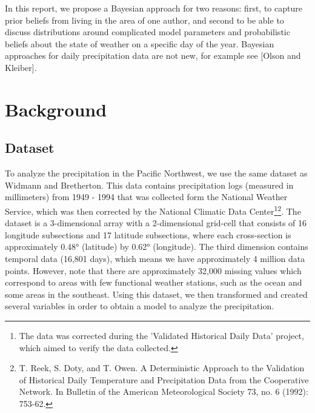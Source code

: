 \documentclass{article}
\begin{document}
In this report, we propose a Bayesian approach for two reasons: first, to capture prior beliefs  from living in the area of one author, and second to be able to discuss distributions around complicated model parameters and probabilistic beliefs about the state of weather on a specific day of the year. Bayesian approaches for daily precipitation data are not new, for example see [Olson and Kleiber].  

\section{Background}

\subsection{Dataset}
To analyze the precipitation in the Pacific Northwest, we use the same dataset as Widmann and Bretherton. This data contains precipitation logs (measured in millimeters) from 1949 - 1994 that was collected form the National Weather Service, which was then corrected by the National Climatic Data Center\footnote{The data was corrected during the 'Validated Historical Daily Data' project, which aimed to verify the data collected.}\footnote{T. Reek, S. Doty, and T. Owen. A Deterministic Approach to the Validation of Historical Daily Temperature and Precipitation Data from the Cooperative Network. In Bulletin of the American Meteorological Society 73, no. 6 (1992): 753-62.}. The dataset is a 3-dimensional array with a 2-dimensional grid-cell that consists of 16 longitude subsections and 17 latitude subsections, where each cross-section is approximately \ang{0.48} (latitude) by \ang{0.62} (longitude). The third dimension contains temporal data (16,801 days), which means we have approximately 4 million data points. However, note that there are approximately 32,000 missing values which correspond to areas with few functional weather stations, such as the ocean and some areas in the southeast. Using this dataset, we then transformed and created several variables in order to obtain a model to analyze the precipitation. 
\end{document}

